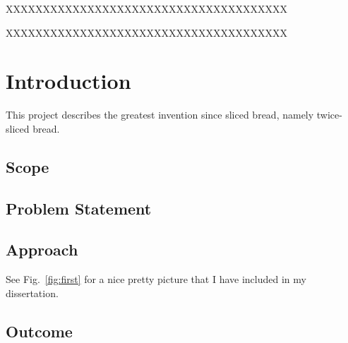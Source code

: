 \documentclass[a4paper,11pt]{report}
\begin{document}
XXXXXXXXXXXXXXXXXXXXXXXXXXXXXXXXXXXXXX

\noindent XXXXXXXXXXXXXXXXXXXXXXXXXXXXXXXXXXXXXX


\newpage



\tableofcontents



\listoffigures


\listoftables



\newpage





\chapter{Introduction}\label{chap:intro}
 
This project describes the greatest invention since sliced bread, 
namely twice-sliced bread.  


\section{Scope}

\section{Problem Statement}\label{sec:problem}

\section{Approach}

See Fig.~\ref{fig:first} for a nice pretty picture that I have included
in my dissertation.  


\section {Outcome}
\end{document}
